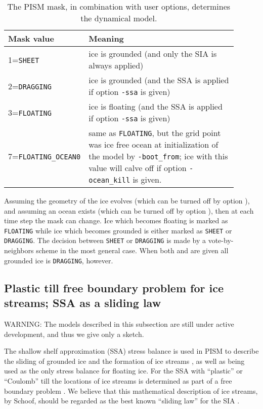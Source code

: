 \begin{table}[ht]
\caption{The PISM mask, in combination with user options, determines the dynamical model.}\label{tab:maskvals} 
\small
\begin{tabular}{p{0.25\linewidth}p{0.65\linewidth}}\hline
\textbf{Mask value} & \textbf{Meaning}\\ \hline
1=\verb|SHEET| & ice is grounded (and only the SIA is always applied) \\
2=\verb|DRAGGING| & ice is grounded (and the SSA is applied if option \verb|-ssa| is given) \\
3=\verb|FLOATING| & ice is floating (and the SSA is applied if option \verb|-ssa| is given) \\
7=\verb|FLOATING_OCEAN0| & same as \verb|FLOATING|, but the grid point was ice free ocean at initialization of the model by \verb|-boot_from|; ice with this value will calve off if option \verb|-ocean_kill| is given.\\
\hline\end{tabular}
\normalsize
\end{table}

Assuming the geometry of the ice evolves (which can be turned off by option ), and assuming an ocean exists (which can be turned off by option ), then at each time step the mask can change.  Ice which becomes floating is marked as \verb|FLOATING| while ice which becomes grounded is either marked as \verb|SHEET| or \verb|DRAGGING|.  The decision between \verb|SHEET| or \verb|DRAGGING| is made by a vote-by-neighbors scheme in the most general case.  When both  and  are given all grounded ice is \verb|DRAGGING|, however.

\subsection{Plastic till free boundary problem for ice streams; SSA as a sliding law}  \label{subsect:plastic}
WARNING: The models described in this subsection are still under active development, and thus we give only a sketch.

The shallow shelf approximation (SSA) stress balance is used in PISM to describe the sliding of grounded ice and the formation of ice streams \cite{BBssasliding}, as well as being used as the only stress balance for floating ice.  For the SSA with ``plastic'' or ``Coulomb'' till the locations of ice streams is determined as part of a free boundary problem \cite{SchoofStream}.  We believe that this mathematical description of ice streams, by Schoof, should be regarded as the best known ``sliding law'' for the SIA \cite{BBssasliding}.

